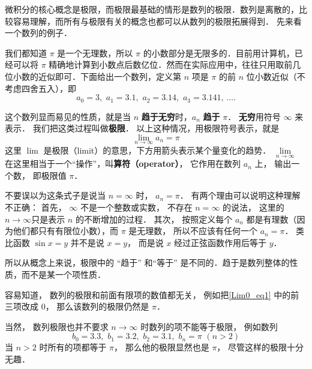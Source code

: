
微积分的核心概念是极限，而极限最基础的情形是数列的极限．数列是离散的，比较容易理解，而所有与极限有关的概念也都可以从数列的极限拓展得到． 先来看一个数列的例子．

\begin{example}{}\label{Lim0_ex1}
我们都知道 $\pi$ 是一个无理数，所以 $\pi$ 的小数部分是无限多的．目前用计算机，已经可以将 $\pi$ 精确地计算到小数点后数亿位．然而在实际应用中，往往只用取前几位小数的近似即可．下面给出一个数列，定义第 $n$ 项是 $\pi$ 的前 $n$ 位小数近似（不考虑四舍五入），即
\begin{equation}\label{Lim0_eq1}
a_0 = 3,\,\, a_1 = 3.1,\,\, a_2 = 3.14,\,\, a_3 = 3.141,\,\dots.
\end{equation}

这个数列显而易见的性质，就是当 $n$ \textbf{趋于无穷}时，$a_n$ \textbf{趋于} $\pi$． \textbf{无穷}用符号 $\infty$ 来表示． 我们把这类过程叫做\textbf{极限}． 以上这种情况，用极限符号表示，就是
\begin{equation}
\lim_{n \to \infty } {a_n} = \pi 
\end{equation}
这里 $\lim$ 是极限（limit）的意思，下方用箭头表示某个量变化的趋势． $\lim\limits_{n \to \infty }$ 在这里相当于一个“操作”，叫\textbf{算符（operator）}， 它作用在数列 $a_n$ 上， 输出一个数， 即极限值 $\pi$．
\end{example}

不要误以为这条式子是说当 $n = \infty$ 时， $a_n=\pi$． 有两个理由可以说明这种理解不正确： 首先， $\infty$ 不是一个整数或实数， 不存在 $n=\infty$ 的说法， 这里的$n\to\infty$只是表示 $n$ 的不断增加的过程． 其次， 按照定义每个 $a_n$ 都是有理数（因为他们都只有有限位小数），而 $\pi$ 是无理数， 所以不应该有任何一个 $a_n=\pi$． 类比函数 $\sin x = y$ 并不是说 $x = y$， 而是说 $x$ 经过正弦函数作用后等于 $y$．

所以从概念上来说，极限中的 “趋于” 和“等于” 是不同的．趋于是数列整体的性质，而不是某一个项性质．

容易知道， 数列的极限和前面有限项的数值都无关， 例如把\autoref{Lim0_eq1} 中的前三项改成 $0$， 那么该数列的极限仍然是 $\pi$．

当然， 数列极限也并不要求 $n\to \infty$ 时数列的项不能等于极限， 例如数列
\begin{equation}
b_0 = 3.3,\,\, b_1 = 3.2, \,\, b_2 = 3.1, \,\, b_n = \pi \,\, (n > 2)
\end{equation}
当 $n > 2$ 时所有的项都等于 $\pi$， 那么他的极限显然也是 $\pi$， 尽管这样的极限十分无趣．

